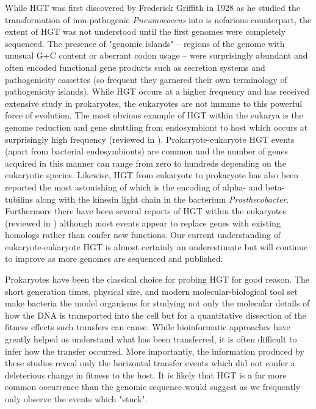 While HGT was first discovered by Frederick Griffith in 1928 as he studied the
transformation of non-pathogenic \textit{Pneumococcus} into is nefarious
counterpart\cite{Griffith:1928vg}, the extent of HGT was not understood until
the first genomes were completely sequenced. The presence of "genomic islands"
-- regions of the genome with unusual G+C content or aberrant codon usage --
were surprisingly abundant and often encoded functional gene products such as
secretion systems and pathogenicity cassettes (so frequent they garnered their
own terminology of pathogenicity islands\cite{Hacker:1990}). While HGT occurs at
a higher frequency and has received extensive study in prokaryotes, the
eukaryotes are not immune to this powerful force of evolution. The most obvious
example of HGT within the eukarya is the genome reduction and gene shuttling
from endosymbiont to host which occurs at surprisingly high frequency (reviewed
in \cite{Timmis:2004ks}).  Prokaryote-eukaryote HGT events (apart from bacterial
endosymbionts) are common and the number of genes acquired in this manner can
range from zero to hundreds depending on the eukaryotic
species\cite{Keeling:2008ch}. Likewise, HGT from eukaryote to prokaryote has
also been reported\cite{Doolittle:1990uo} the most astonishing of which is the
encoding of alpha- and beta-tubilins along with the kinesin light chain in the
bacterium \textit{Prosthecobacter}\cite{Jenkins:2002ty}. Furthermore there have
been several reports of HGT within the eukaryotes (reviewed in
\citet{Keeling:2008ch}) although most events appear to  replace genes with
existing homologs rather than confer new functions. Our current understanding of
eukaryote-eukaryote HGT is almost certainly an underestimate but will continue
to improve as more genomes are sequenced and published.

Prokaryotes have been the classical choice for probing HGT for good reason.
The short generation times, physical size, and modern molecular-biological tool
set make bacteria the model organisms for studying not only the molecular
details of how the DNA is transported into the cell but for a quantitative
dissection of the fitness effects such transfers can cause. While bioinformatic
approaches have greatly helped us understand what has been transferred, it is
often difficult to infer how the transfer occurred. More importantly, the
information produced by these studies reveal only the horizontal transfer events
which did not confer a deleterious change in fitness to the host. It is likely
that HGT is a far more common occurrence than the genomic sequence would suggest
as we frequently only observe the events which "stuck".


